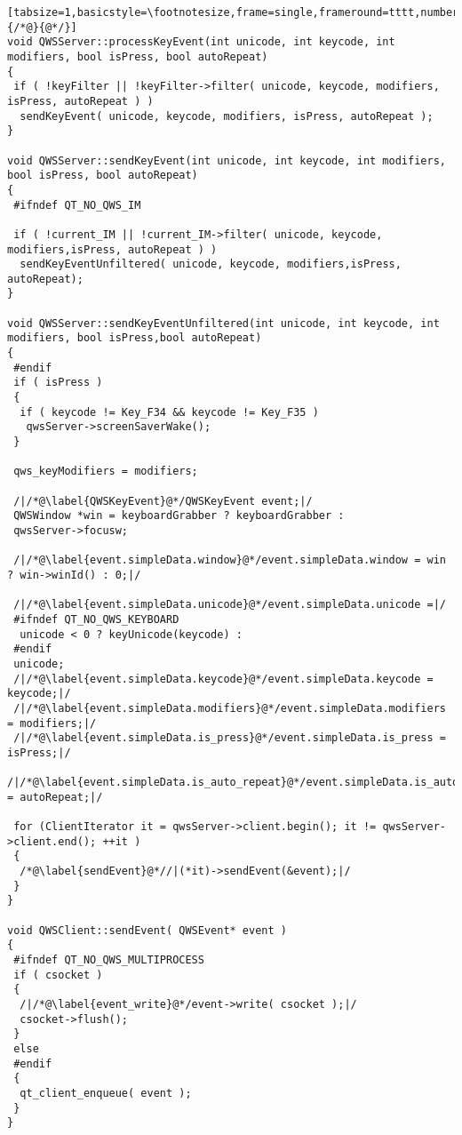 \begin{lstlisting}[tabsize=1,basicstyle=\footnotesize,frame=single,frameround=tttt,numbers=left,breaklines=true,title=\$QTDIR/src/embedded/qwindowsystem\_{}qws.cpp,escapeinside={/*@}{@*/}]
void QWSServer::processKeyEvent(int unicode, int keycode, int modifiers, bool isPress, bool autoRepeat)
{
 if ( !keyFilter || !keyFilter->filter( unicode, keycode, modifiers, isPress, autoRepeat ) )
  sendKeyEvent( unicode, keycode, modifiers, isPress, autoRepeat );
}

void QWSServer::sendKeyEvent(int unicode, int keycode, int modifiers, bool isPress, bool autoRepeat)
{
 #ifndef QT_NO_QWS_IM

 if ( !current_IM || !current_IM->filter( unicode, keycode, modifiers,isPress, autoRepeat ) )
  sendKeyEventUnfiltered( unicode, keycode, modifiers,isPress, autoRepeat);
}

void QWSServer::sendKeyEventUnfiltered(int unicode, int keycode, int modifiers, bool isPress,bool autoRepeat)
{
 #endif
 if ( isPress ) 
 {
  if ( keycode != Key_F34 && keycode != Key_F35 )
   qwsServer->screenSaverWake();
 }

 qws_keyModifiers = modifiers;

 /|/*@\label{QWSKeyEvent}@*/QWSKeyEvent event;|/
 QWSWindow *win = keyboardGrabber ? keyboardGrabber :
 qwsServer->focusw;

 /|/*@\label{event.simpleData.window}@*/event.simpleData.window = win ? win->winId() : 0;|/

 /|/*@\label{event.simpleData.unicode}@*/event.simpleData.unicode =|/
 #ifndef QT_NO_QWS_KEYBOARD
  unicode < 0 ? keyUnicode(keycode) :
 #endif
 unicode;
 /|/*@\label{event.simpleData.keycode}@*/event.simpleData.keycode = keycode;|/
 /|/*@\label{event.simpleData.modifiers}@*/event.simpleData.modifiers = modifiers;|/
 /|/*@\label{event.simpleData.is_press}@*/event.simpleData.is_press = isPress;|/
 /|/*@\label{event.simpleData.is_auto_repeat}@*/event.simpleData.is_auto_repeat = autoRepeat;|/

 for (ClientIterator it = qwsServer->client.begin(); it != qwsServer->client.end(); ++it ) 
 {
  /*@\label{sendEvent}@*//|(*it)->sendEvent(&event);|/
 }
}

void QWSClient::sendEvent( QWSEvent* event )
{
 #ifndef QT_NO_QWS_MULTIPROCESS
 if ( csocket ) 
 {
  /|/*@\label{event_write}@*/event->write( csocket );|/
  csocket->flush();
 }
 else
 #endif
 {
  qt_client_enqueue( event );
 }
}
\end{lstlisting}

